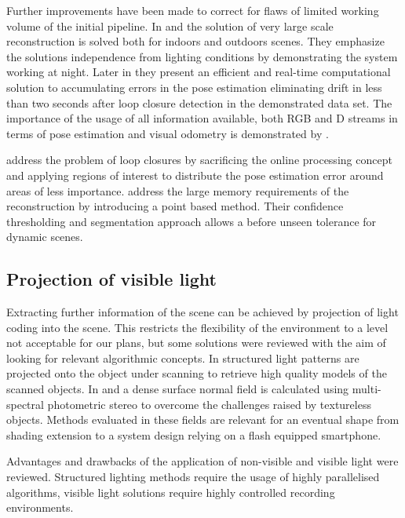 \documentclass{ucl_thesis}
\begin{document}
\par Further improvements have been made to correct for flaws of limited working volume of the initial pipeline. In \citep{Whelan12rssw} and \citep{Chen:2013:Scalable_volumetric} the solution of very large scale reconstruction is solved both for indoors and outdoors scenes. They emphasize the solutions independence from lighting conditions by demonstrating the system working at night. Later in \citep{Whelan13iros} they present an efficient and real-time computational solution to accumulating errors in the pose estimation eliminating drift in less than two seconds after loop closure detection in the demonstrated data set. The importance of the usage of all information available, both RGB and D streams in terms of pose estimation and visual odometry is demonstrated by \citep{Whelan13icra}.

\par \citep{Zhou:2013} address the problem of loop closures by sacrificing the online processing concept and applying regions of interest to distribute the pose estimation error around areas of less importance. \citep{keller13realtime} address the large memory requirements of the reconstruction by introducing a point based method. Their confidence thresholding and segmentation approach allows a before unseen tolerance for dynamic scenes.

\subsection{Projection of visible light}
Extracting further information of the scene can be achieved by projection of light coding into the scene. This restricts the flexibility of the environment to a level not acceptable for our plans, but some solutions were reviewed with the aim of looking for relevant algorithmic concepts. In \cite{DBLP:journals/tog/RusinkiewiczHL02} structured light patterns are projected onto the object under scanning to retrieve high quality models of the scanned objects. In \cite{HernandezEtc_ICCV07} and \cite{pami/BrostowHVSC11/VideoNormals} a dense surface normal field is calculated using multi-spectral photometric stereo to overcome the challenges raised by textureless objects. Methods evaluated in these fields are relevant for an eventual shape from shading extension to a system design relying on a flash equipped smartphone.\\

\par Advantages and drawbacks of the application of non-visible and visible light were reviewed. Structured lighting methods require the usage of highly parallelised algorithms, visible light solutions require highly controlled recording environments. 
\end{document}
